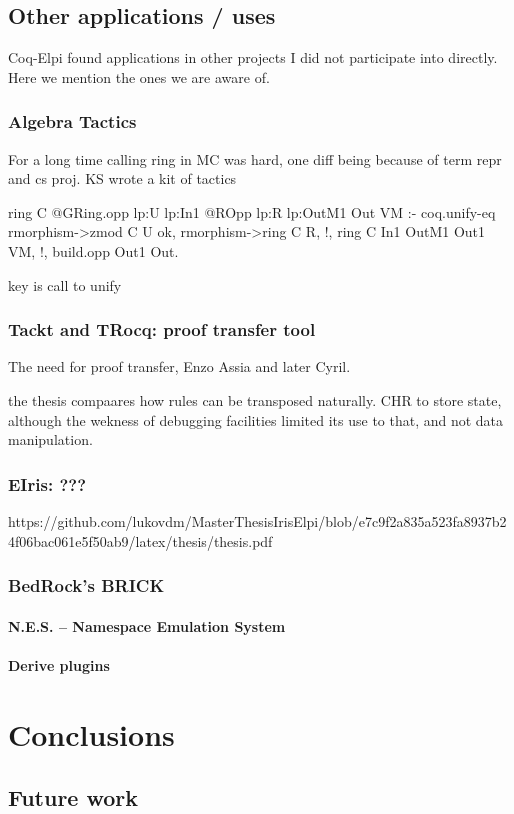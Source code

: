 \documentclass[a4paper, 11pt]{book}
\begin{document}
\section{Other applications / uses}

Coq-Elpi found applications in other projects I did not participate
into directly. Here we mention the ones we are aware of.

\subsection{Algebra Tactics}

For a long time calling ring in MC was hard, one diff
being because of term
repr and cs proj. KS wrote a kit of tactics

\cite{sakaguchi:LIPIcs.ITP.2022.29}

\begin{elpicode}
ring C {{ @GRing.opp lp:U lp:In1 }} {{ @ROpp lp:R lp:OutM1 }} Out VM :-
  coq.unify-eq { rmorphism->zmod C } U ok,
  rmorphism->ring C R, !,
  ring C In1 OutM1 Out1 VM, !,
  build.opp Out1 Out.  
\end{elpicode}

key is call to unify

\subsection{Tackt and TRocq: proof transfer tool}

The need for proof transfer, Enzo Assia and later Cyril.

\cite{DBLP:conf/cpp/Blot0CPKMV23}
\cite{10.1007/978-3-031-57262-3_10}

the thesis compaares how rules can be transposed naturally.
CHR to store state, although the wekness of debugging
facilities limited its use to that, and not data manipulation.

\subsection{EIris: ???}

https://github.com/lukovdm/MasterThesisIrisElpi/blob/e7c9f2a835a523fa8937b24f06bac061e5f50ab9/latex/thesis/thesis.pdf

\subsection{BedRock's BRICK}
\subsubsection{N.E.S. -- Namespace Emulation System}



\subsubsection{Derive plugins}

\chapter{Conclusions}
\section{Future work}
\nocite{*}
\printbibliography[title={Our Bibliography}, keyword=me]
\printbibliography[title={Bibliography}, keyword=they]
\end{document}
